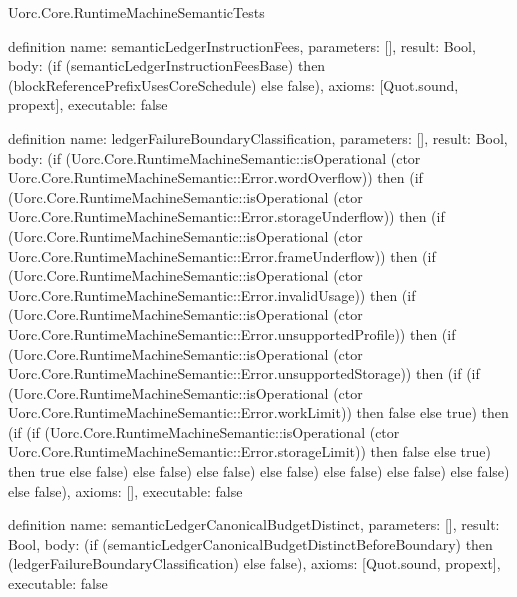\begin{lexlean}{Uorc.Core.RuntimeMachineSemanticTests}
\begin{semanticmodule}
definition{
  name: semanticLedgerInstructionFees,
  parameters: [],
  result: Bool,
  body: (if (semanticLedgerInstructionFeesBase) then (blockReferencePrefixUsesCoreSchedule) else false),
  axioms: [Quot.sound, propext],
  executable: false
}

definition{
  name: ledgerFailureBoundaryClassification,
  parameters: [],
  result: Bool,
  body: (if (Uorc.Core.RuntimeMachineSemantic::isOperational (ctor Uorc.Core.RuntimeMachineSemantic::Error.wordOverflow)) then (if (Uorc.Core.RuntimeMachineSemantic::isOperational (ctor Uorc.Core.RuntimeMachineSemantic::Error.storageUnderflow)) then (if (Uorc.Core.RuntimeMachineSemantic::isOperational (ctor Uorc.Core.RuntimeMachineSemantic::Error.frameUnderflow)) then (if (Uorc.Core.RuntimeMachineSemantic::isOperational (ctor Uorc.Core.RuntimeMachineSemantic::Error.invalidUsage)) then (if (Uorc.Core.RuntimeMachineSemantic::isOperational (ctor Uorc.Core.RuntimeMachineSemantic::Error.unsupportedProfile)) then (if (Uorc.Core.RuntimeMachineSemantic::isOperational (ctor Uorc.Core.RuntimeMachineSemantic::Error.unsupportedStorage)) then (if (if (Uorc.Core.RuntimeMachineSemantic::isOperational (ctor Uorc.Core.RuntimeMachineSemantic::Error.workLimit)) then false else true) then (if (if (Uorc.Core.RuntimeMachineSemantic::isOperational (ctor Uorc.Core.RuntimeMachineSemantic::Error.storageLimit)) then false else true) then true else false) else false) else false) else false) else false) else false) else false) else false),
  axioms: [],
  executable: false
}

definition{
  name: semanticLedgerCanonicalBudgetDistinct,
  parameters: [],
  result: Bool,
  body: (if (semanticLedgerCanonicalBudgetDistinctBeforeBoundary) then (ledgerFailureBoundaryClassification) else false),
  axioms: [Quot.sound, propext],
  executable: false
}
\end{semanticmodule}

\end{lexlean}
